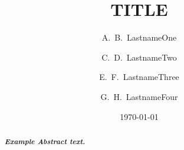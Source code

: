 \documentclass[twocolumn]{revtex4-2}	%
\begin{document}
\newcommand{\ke}{kinetic energy (KE)\renewcommand{\ke}{KE}}
\newcommand{\pe}{potential energy (PE)\renewcommand{\pe}{PE}}

\newcommand{\dash}{\textbf{---}\ } %
\newcommand{\bs}{\boldsymbol} %
\newcommand{\nucl}[2]{{}^{#1}\mbox{#2}} %

\title{TITLE}

\author{A.~B.~LastnameOne} %
\author{C.~D.~LastnameTwo}
\author{E.~F.~LastnameThree}
\author{G.~H.~LastnameFour}

\date{\today}

\begin{abstract}
\emph{\textbf{Example Abstract text.}}
\lipsum[91]
\end{abstract}

\maketitle %
\tableofcontents







\end{document}
